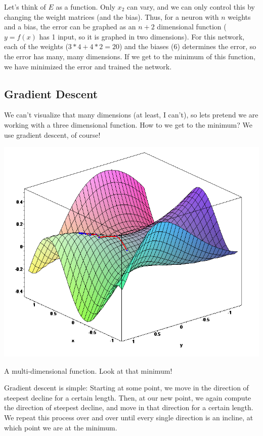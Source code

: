 \documentclass{article}
\begin{document}
Let's think of $E$ as a function. Only $x_2$ can vary, and we can only control this by changing the weight matrices (and the bias). Thus, for a neuron with $n$ weights and a bias, the error can be graphed as an $n+2$ dimensional function ($y = f(x)$ has 1 input, so it is graphed in two dimensions). For this network, each of the weights ($3*4 + 4*2 = 20$) and the biases ($6$) determines the error, so the error has many, many dimensions. If we get to the minimum of this function, we have minimized the error and trained the network.

\subsection{Gradient Descent}
We can't visualize that many dimensions (at least, I can't), so lets pretend we are working with a three dimensional function. How to we get to the minimum? We use gradient descent, of course!
\begin{center}
\includegraphics[scale=0.3]{gd}

A multi-dimensional function. Look at that minimum!

\end{center}

Gradient descent is simple: Starting at some point, we move in the direction of steepest decline for a certain length. Then, at our new point, we again compute the direction of steepest decline, and move in that direction for a certain length. We repeat this process over and over until every single direction is an incline, at which point we are at the minimum.
\end{document}
